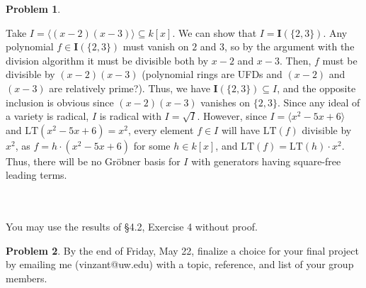 \documentclass[12pt]{amsart}
\theoremstyle{definition}
\newtheorem{prob}{Problem}
\begin{document}
\begin{flushleft}
\begin{prob}
\begin{enumerate}
    Take $I = \langle(x-2)(x-3)\rangle \subseteq k[x]$. We can show that $I=\mathbf I(\{2,3\})$. Any polynomial $f \in \mathbf I(\{2,3\})$ must vanish on $2$ and $3$, so by the argument with the division algorithm it must be divisible both by $x-2$ and $x-3$. Then, $f$ must be divisible by $(x-2)(x-3)$ (polynomial rings are UFDs and $(x-2)$ and $(x-3)$ are relatively prime?). Thus, we have $\mathbf I(\{2,3\})\subseteq I$, and the opposite inclusion is obvious since $(x-2)(x-3)$ vanishes on $\{2,3\}$. Since any ideal of a variety is radical, $I$ is radical with $I = \sqrt I$. However, since $I = \langle x^2-5x+6\rangle$ and $\text{LT}(x^2-5x+6)=x^2$, every element $f \in I$ will have $\text{LT}(f)$ divisible by $x^2$, as $f = h\cdot (x^2-5x+6)$ for some $h \in k[x]$, and $\text{LT}(f) = \text{LT}(h)\cdot x^2$. Thus, there will be no Gr\"obner basis for $I$ with generators having square-free leading terms.
\end{enumerate}
\ \\ \ \\
You may use the results of \S4.2, Exercise 4 without proof.
\end{prob}

\bigskip 


\begin{prob}  By the end of Friday, May 22, finalize a choice for your final project by emailing me (vinzant@uw.edu) with a topic, reference, and list of your group members. \end{prob}


\end{flushleft}
\end{document}
